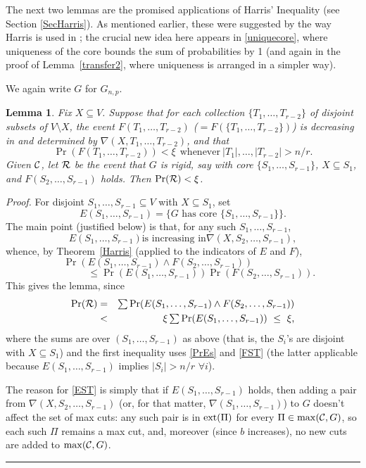 \documentclass[letterpaper,11pt]{article}
\newtheorem{lemma}[thm]{Lemma}
\newcommand{\beq}[1]{\begin{equation}\label{#1}}
\newcommand{\enq}[0]{\end{equation}}
\newcommand{\nin}[0]{\noindent}
\newcommand{\sub}[0]{\subseteq}
\newcommand{\sm}[0]{\setminus}
\renewcommand{\dots}[0]{,\ldots,}
\newcommand{\cee}[0]{{\cal C}}
\newcommand{\R}[0]{{\cal R}}
\newcommand{\ext}[0]{{\rm ext}}
\newcommand{\0}[0]{\emptyset}
\renewcommand{\qed}[0]{\begin{flushright} \rule{2mm}{3mm} \end{flushright}}
\begin{document}
\medskip
The next two lemmas are the promised applications
of Harris' Inequality (see Section \ref{SecHarris}).
As mentioned earlier, these were  suggested by the
way Harris is used in \cite{BPS};
the crucial new idea here appears in \eqref{uniquecore},
where uniqueness of the core bounds the sum of probabilities by 1
(and again in the proof of Lemma~\ref{transfer2}, where
uniqueness is arranged in a simpler way).

We again write $G$ for $G_{n,p}$.


\begin{lemma}\label{transfer}
Fix $X\sub V$.
Suppose that for each collection
$\{T_1\dots T_{r-2}\}$ of disjoint subsets of $V\sm X$,
the event $F(T_1\dots T_{r-2})$ ($=F(\{T_1\dots T_{r-2}\})$) is
decreasing in and determined by
$\nabla(X,T_1\dots T_{r-2})$,
and that
\beq{FST}
\Pr(F(T_1\dots T_{r-2}))< \xi ~~\mbox{whenever} ~
|T_1|\dots |T_{r-2}| > n/r.
\enq
Given $\cee$, let $\R$ be the event
that $G$ is rigid, say with core $\{S_1\dots S_{r-1}\}$,
$X\sub S_1$, and $F(S_2\dots S_{r-1})$ holds.
Then $\Pr(\R)< \xi$.
\end{lemma}
\nin
{\em Proof.}
For disjoint $S_1\dots S_{r-1}\sub V$ with
$X\sub S_1$, set
\[%
E(S_1\dots S_{r-1})=
\{\mbox{$G$ has core $\{S_1\dots S_{r-1}\}$}\}.
\]%
The main point (justified below) is that,
for any such $S_1\dots S_{r-1}$,
\beq{EST}
\mbox{$E(S_1\dots S_{r-1})$
is increasing in
$\nabla(X,S_2\dots S_{r-1})$},
\enq
whence,
by Theorem~\ref{Harris} (applied to the indicators of $E$
and $F$),
\[
\Pr(E(S_1\dots S_{r-1})\wedge F(S_2\dots S_{r-1}))
~~~~~~~~~~~~~~~~~~~~~~~
\]
\beq{PrEs}
~~~~~~~~~~~~~~~~~
\leq \Pr(E(S_1\dots S_{r-1}))
\Pr(F(S_2\dots S_{r-1})).
\enq
This gives the lemma, since
\begin{eqnarray}
\Pr(\R)&=&
\mbox{$\sum\Pr(E(S_1\dots S_{r-1})
\wedge F(S_2\dots S_{r-1}))$}\nonumber\\
&<& \mbox{$\xi\sum\Pr(E(S_1\dots S_{r-1}))
~\leq ~\xi$,}\label{uniquecore}
\end{eqnarray}
where the sums are over $(S_1\dots S_{r-1})$ as above
(that is, the $S_i$'s are disjoint with $X\sub S_1$)
and the first inequality uses \eqref{PrEs} and \eqref{FST}
(the latter applicable because $E(S_1\dots S_{r-1})$ implies $|S_i|>n/r$ $\forall i$).

The reason for \eqref{EST} is simply that if
$E(S_1\dots S_{r-1})$ holds, then
adding a pair from
$\nabla(X,S_2\dots S_{r-1})$
(or, for that matter, $\nabla(S_1\dots S_{r-1})$)
to $G$ doesn't affect the set of max cuts:
any such pair is in $\ext(\Pi)$ for every $\Pi\in \max(\cee,G)$,
so each such $\Pi$
remains a max cut, and, moreover (since $b$ increases),
no new cuts are added to $\max(\cee,G)$.\qed
\end{document}
